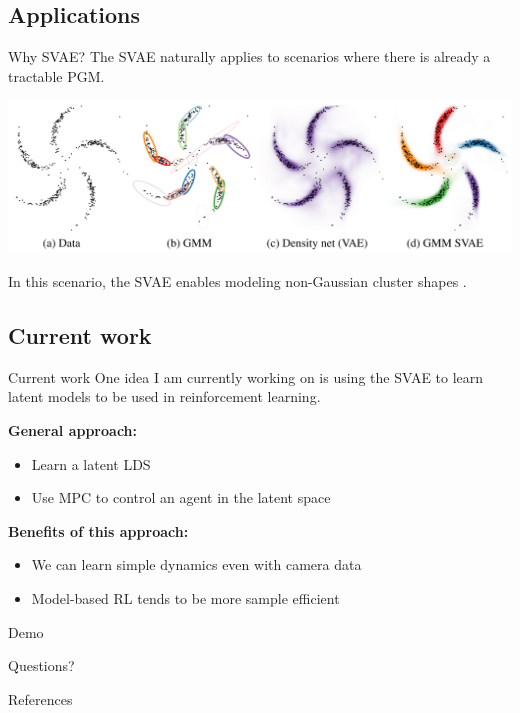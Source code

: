 \documentclass[10pt, compress]{beamer}
\begin{document}
\subsection{Applications}
\begin{frame}{Why SVAE?}
	The SVAE naturally applies to scenarios where there is already a tractable PGM.

	\pause
	\begin{center}
		\includegraphics[frame,width=\textwidth]{img/svae-example}
	\end{center}

	\pause
	In this scenario, the SVAE enables modeling non-Gaussian cluster shapes \cite{svae}.
\end{frame}

\subsection{Current work}
\begin{frame}{Current work}
	One idea I am currently working on is using the SVAE to learn
	latent models to be used in reinforcement learning\footnotemark.

	\pause
	\textbf{General approach:}
	\begin{itemize}
		\item Learn a latent LDS
		\item Use MPC to control an agent in the latent space
	\end{itemize}

	\pause
	\textbf{Benefits of this approach:}
	\begin{itemize}
			\pause
		\item We can learn simple dynamics even with camera data
			\pause
		\item Model-based RL tends to be more sample efficient
			\pause
	\end{itemize}
	\pause
	\alert{Demo}
\end{frame}

\begin{frame}[standout]
	Questions?
\end{frame}

\appendix
\begin{frame}[allowframebreaks]{References}
	
	
\end{frame}
\end{document}
